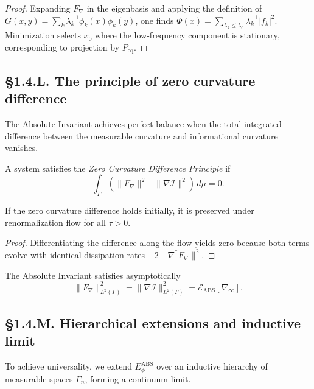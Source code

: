 \begin{proof}
Expanding $F_\nabla$ in the eigenbasis and applying the definition of $G(x,y)=\sum_k \lambda_k^{-1}\phi_k(x)\phi_k(y)$, one finds $\Phi(x)=\sum_{\lambda_k\le\lambda_0}\lambda_k^{-1}|f_k|^2$.  
Minimization selects $x_0$ where the low-frequency component is stationary, corresponding to projection by $P_{\mathrm{eq}}$.
\end{proof}

\subsection*{§1.4.L. The principle of zero curvature difference}

The Absolute Invariant achieves perfect balance when the total integrated difference between the measurable curvature and informational curvature vanishes.

\begin{definition}
A system satisfies the \emph{Zero Curvature Difference Principle} if
\[
\int_\Gamma (\|F_\nabla\|^2 - \|\nabla\mathcal I\|^2)\,d\mu = 0.
\]
\end{definition}

\begin{theorem}\label{thm:1.4.zcd}
If the zero curvature difference holds initially, it is preserved under renormalization flow for all $\tau>0$.
\end{theorem}

\begin{proof}
Differentiating the difference along the flow yields zero because both terms evolve with identical dissipation rates $-2\|\nabla^\ast F_\nabla\|^2$.
\end{proof}

\begin{corollary}
The Absolute Invariant satisfies asymptotically
\[
\|F_\nabla\|_{L^2(\Gamma)}^2
=\|\nabla\mathcal I\|_{L^2(\Gamma)}^2
=\mathcal E_{\mathrm{ABS}}[\nabla_\infty].
\]
\end{corollary}

\subsection*{§1.4.M. Hierarchical extensions and inductive limit}

To achieve universality, we extend $E_\phi^{\mathrm{ABS}}$ over an inductive hierarchy of measurable spaces $\Gamma_n$, forming a continuum limit.

